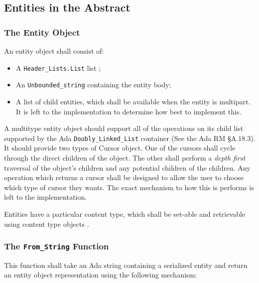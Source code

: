 \documentclass[11pt]{article}
\begin{document}
\subsection{Entities in the Abstract}
\label{sr:abstract-entities}

\subsubsection{The Entity Object}

An entity object shall consist of:

\begin{itemize}
\item A \texttt{Header\_Lists.List} list ; 
\item An \texttt{Unbounded\_string} containing the entity body;
\item A list of child entities, which shall be available when the
  entity is multipart. It is left to the implementation to determine
  how best to implement this.
\end{itemize}

A multitype entity object should support all of the operations on its
child list supported by the Ada \texttt{Doubly\_Linked\_List}
container (See the Ada RM \S{}A.18.3). It should provide two types of
Cursor object. One of the cursors shall cycle through the direct
children of the object. The other shall perform a \emph{depth first}
traversal of the object's children and any potential children of the
children. Any operation which returns a cursor shall be designed to
allow the user to choose which type of cursor they wants. The exact
mechanism to how this is performs is left to the implementation.

Entities have a particular content type, which shall be set-able and
retrievable using content type objects .   

\subsubsection{The \texttt{From\_String} Function}

This function shall take an Ada string containing a serialized entity
and return an entity object representation using the following
mechanism:
\end{document}

